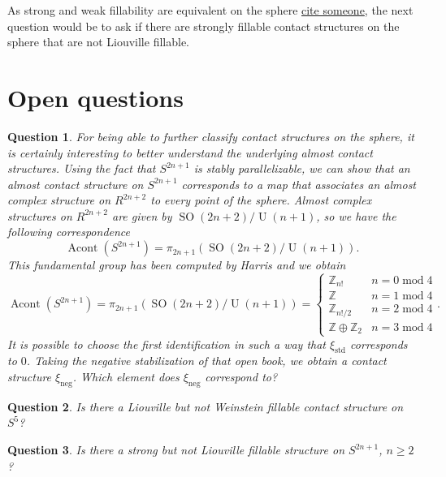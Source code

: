 \documentclass{amsart}
\newtheorem{question}{Question}
\begin{document}
As strong and weak fillability are equivalent on the sphere \underline{cite someone},
the next question would be to ask if there are strongly fillable contact structures on the sphere that are not Liouville fillable.



\section*{Open questions}
\begin{question}
    For being able to further classify contact structures on the sphere, it is certainly interesting to better understand the underlying almost contact structures.
    Using the fact that $S^{2n+1}$ is stably parallelizable, we can show that an almost contact structure on $S^{2n+1}$ corresponds to a map that associates an almost complex structure on $R^{2n+2}$
    to every point of the sphere.
    Almost complex structures on $R^{2n+2}$ are given by $\operatorname{SO}(2n + 2)/\operatorname{U}(n + 1)$, so we have the following correspondence
    \[
        \operatorname{Acont}\left(S^{2n+1}\right) = \pi_{2n+1}(\operatorname{SO}(2n + 2)/\operatorname{U}(n + 1)).
    \]
    This fundamental group has been computed by Harris \cite{Harris63} and we obtain
    \[
        \operatorname{Acont}\left(S^{2n+1}\right) = \pi_{2n+1}(\operatorname{SO}(2n + 2)/\operatorname{U}(n + 1)) = \begin{cases}
            \mathbb Z_{n!} &n = 0 \operatorname{mod} 4\\
            \mathbb Z &n = 1 \operatorname{mod} 4\\
            \mathbb Z_{n!/2} &n = 2 \operatorname{mod} 4\\
            \mathbb Z \oplus \mathbb Z_2 &n = 3 \operatorname{mod} 4
        \end{cases}.
    \]
    It is possible to choose the first identification in such a way that $\xi_{\mathrm{std}}$ corresponds to $0$.
    Taking the negative stabilization of that open book, we obtain a contact structure $\xi_\mathrm{neg}$. Which element does $\xi_\mathrm{neg}$ correspond to?

\end{question}
\begin{question}    
Is there a Liouville but not Weinstein fillable contact structure on $S^5$? 
\end{question}
\begin{question}
Is there a strong but not Liouville fillable structure on $S^{2n+1}$, $n \ge 2$?
\end{question}
\newpage
\nocite{*}


\end{document}
